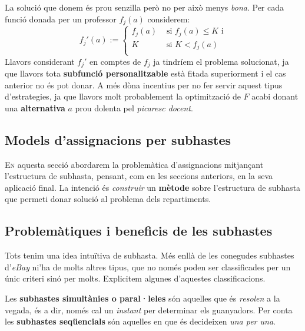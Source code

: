 \documentclass[10pt,twocolumn]{article}
\newcommand{\esp}{\text{ }}
\begin{document}
La solució que donem és prou senzilla però no per això menys \textit{bona}. Per cada funció donada per un professor $f_j(a)$ considerem:
$$
f_j'(a):=
\begin{cases}
f_j(a) &\text{ si } f_j(a)\leq K \text{ i}\\
K &\text{ si } K<f_j(a)\\
\end{cases}
$$
Llavors considerant $f_j'$ en comptes de $f_j$ ja tindríem el problema solucionat, ja que llavors tota \textbf{subfunció personalitzable} està fitada superiorment i el cas anterior no és pot donar. A més dòna incentius per no fer servir aquest tipus d'estrategies, ja que llavors molt probablement la optimització de $F$ acabi donant una \textbf{alternativa} $a$ prou dolenta pel \textit{picaresc docent}.
\newpage
$$
\esp
$$
\newpage
\begin{tcolorbox}[colframe=white,colback=redviolet!20,sharp corners=all,size=minimal,halign=center,valign=center]
	\section{Models d'assignacions per subhastes}
\end{tcolorbox}
\lettrine{E}n aquesta secció abordarem la problemàtica d'assignacions mitjançant l'estructura de subhasta, pensant, com en les seccions anteriors, en la seva aplicació final. La intenció  és \textit{construir} un \textbf{mètode} sobre l'estructura de subhasta que permeti  donar solució al problema dels repartiments.
\subsection{Problemàtiques i beneficis de les subhastes}
Tots tenim una idea intuïtiva de subhasta. Més enllà de les conegudes subhastes d'\textit{eBay}  ni'ha de molts altres tipus, que no només poden ser classificades per un únic criteri sinó per molts. Explicitem algunes d'aquestes classificacions.

Les \textbf{subhastes simultànies o paral·leles} són aquelles que és \textit{resolen} a la vegada, és a dir, només cal un \textit{instant} per determinar els guanyadors. Per conta les \textbf{subhastes seqüencials } són aquelles en que és decideixen \textit{una per una}. 
\end{document}
